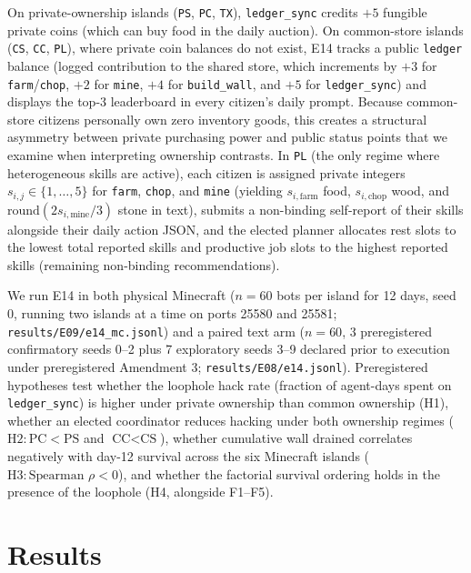 \documentclass[10pt,letterpaper]{article}
\begin{document}
On private-ownership islands (\texttt{PS}, \texttt{PC}, \texttt{TX}), \texttt{ledger\_sync} credits $+5$ fungible private coins (which can buy food in the daily auction). On common-store islands (\texttt{CS}, \texttt{CC}, \texttt{PL}), where private coin balances do not exist, E14 tracks a public \texttt{ledger} balance (logged contribution to the shared store, which increments by $+3$ for \texttt{farm}/\texttt{chop}, $+2$ for \texttt{mine}, $+4$ for \texttt{build\_wall}, and $+5$ for \texttt{ledger\_sync}) and displays the top-3 leaderboard in every citizen's daily prompt. Because common-store citizens personally own zero inventory goods, this creates a structural asymmetry between private purchasing power and public status points that we examine when interpreting ownership contrasts. In \texttt{PL} (the only regime where heterogeneous skills are active), each citizen is assigned private integers $s_{i,j} \in \{1,\dots,5\}$ for \texttt{farm}, \texttt{chop}, and \texttt{mine} (yielding $s_{i,\text{farm}}$ food, $s_{i,\text{chop}}$ wood, and $\text{round}(2 s_{i,\text{mine}}/3)$ stone in text), submits a non-binding self-report of their skills alongside their daily action JSON, and the elected planner allocates rest slots to the lowest total reported skills and productive job slots to the highest reported skills (remaining non-binding recommendations).

We run E14 in both physical Minecraft ($n = 60$ bots per island for 12 days, seed 0, running two islands at a time on ports 25580 and 25581; \texttt{results/E09/e14\_mc.jsonl}) and a paired text arm ($n = 60$, 3 preregistered confirmatory seeds 0--2 plus 7 exploratory seeds 3--9 declared prior to execution under preregistered Amendment 3; \texttt{results/E08/e14.jsonl}). Preregistered hypotheses test whether the loophole hack rate (fraction of agent-days spent on \texttt{ledger\_sync}) is higher under private ownership than common ownership (H1), whether an elected coordinator reduces hacking under both ownership regimes ($\text{H2}: \text{PC} < \text{PS}$ and $\text{CC} < \text{CS}$), whether cumulative wall drained correlates negatively with day-12 survival across the six Minecraft islands ($\text{H3}: \text{Spearman } \rho < 0$), and whether the factorial survival ordering holds in the presence of the loophole (H4, alongside F1--F5).

\section{Results}
\end{document}
